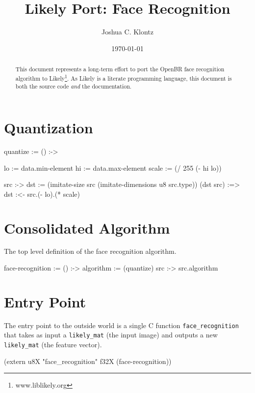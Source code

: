 \documentclass{article}
\title{Likely Port: Face Recognition}
\author{Joshua C. Klontz}
\date{\today}
\newenvironment{likely}
{ \verbatim }
{ \endverbatim }
\begin{document}
\maketitle

\begin{abstract}
This document represents a long-term effort to port the OpenBR face recognition algorithm to Likely\footnote{www.liblikely.org}.
As Likely is a literate programming language, this document is both the source code \emph{and} the documentation.
\end{abstract}

\section{Quantization}
\begin{likely}
quantize :=
  () :->
  {
    lo := data.min-element
    hi := data.max-element
    scale := (/ 255 (- hi lo))

    src :->
    {
      dst := (imitate-size src (imitate-dimensions u8 src.type))
      (dst src) :=>
        dst :<- src.(- lo).(* scale)
    }
  }
\end{likely}

\section{Consolidated Algorithm}
The top level definition of the face recognition algorithm.

\begin{likely}
face-recognition :=
  () :->
  {
    algorithm := (quantize)
    src :->
      src.algorithm
  }
\end{likely}

\section{Entry Point}
The entry point to the outside world is a single C function \texttt{face\_recognition} that takes as input a \texttt{likely\_mat} (the input image) and outputs a new \texttt{likely\_mat} (the feature vector).

\begin{likely}
(extern u8X "face_recognition" f32X (face-recognition))
\end{likely}
\end{document}
